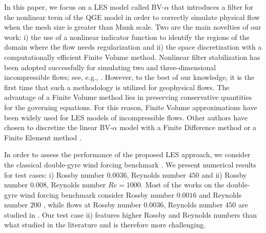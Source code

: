 \documentclass[11pt,a4paper]{article}
\begin{document}
In this paper, we focus on a LES model called BV-$\alpha$ \cite{Nadiga2001, Holm2003, Monteiro2015, Monteiro2014} 
that introduces a filter for the nonlinear term of the QGE model in order to correctly simulate physical flow 
when the mesh size is greater than Munk scale. Two are the main novelties of our work: i) 
the use of a nonlinear indicator function to identify the regions of the domain where the flow needs regularization
and ii) the space discretization with a computationally efficient Finite Volume method. 
Nonlinear filter stabilization has been adopted successfully for simulating two and three-dimensional incompressible flows; see, e.g., 
\cite{layton_CMAME,abigail_CMAME,BQV,Girfoglio2019}. %
However, to the best of our knowledge, it is the first time that such a methodology is utilized for 
geophysical flows. The advantage of a Finite Volume method lies in preserving
conservative quantities for the governing equations. For this reason,
Finite Volume approximations have been widely used for LES models of incompressible flows. 
Other authors have chosen to discretize the linear BV-$\alpha$ model with a Finite Difference method 
\cite{Nadiga2001, Holm2003} or a Finite Element method \cite{Monteiro2015, Monteiro2014}.

In order to assess the performance of the proposed LES approach, we consider the classical 
double-gyre wind forcing benchmark \cite{Nadiga2001, Holm2003, Monteiro2015, Monteiro2014, Greathbatch2000, San2014}. We present numerical results for test
cases: i) Rossby number $0.0036$, Reynolds number $450$ 
and ii) Rossby number $0.008$, Reynolds number  
$Re = 1000$. Most of the works on the double-gyre wind forcing benchmark consider
Rossby number $0.0016$ and Reynolds number $200$ \cite{Nadiga2001, Holm2003, Monteiro2015, Monteiro2014}, 
while flows at Rossby number $0.0036$, Reynolds number $450$ are studied in \cite{San2012,San2014}.
Our test case ii) features higher Rossby and Reynolds numbers than what studied in the literature
and is therefore more challenging.
\end{document}
